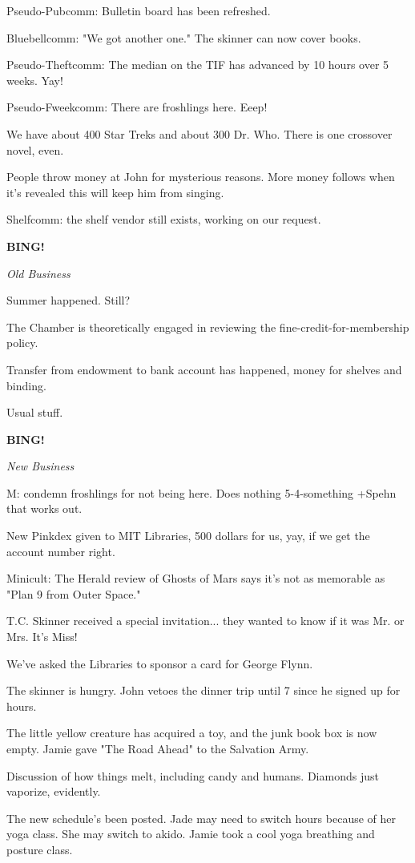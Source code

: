 \documentclass[12pt]{article}
\newcommand{\bing}{{\bf BING!} }
\newcommand{\goto}[1]{\bing \vskip 12pt \centerline{{\em{#1}}}}
\begin{document}
Pseudo-Pubcomm: Bulletin board has been refreshed.

Bluebellcomm: "We got another one." The skinner can now cover books.

Pseudo-Theftcomm: The median on the TIF has advanced by 10 hours over 5 weeks. Yay!

Pseudo-Fweekcomm: There are froshlings here. Eeep!

We have about 400 Star Treks and about 300 Dr. Who. There is one crossover novel, even.

People throw money at John for mysterious reasons. More money follows when it's revealed this will keep him from singing.

Shelfcomm: the shelf vendor still exists, working on our request.

\goto{Old Business}

Summer happened. Still?

The Chamber is theoretically engaged in reviewing the fine-credit-for-membership policy.

Transfer from endowment to bank account has happened, money for shelves and binding.

Usual stuff.

\goto{New Business}

M: condemn froshlings for not being here. Does nothing 5-4-something +Spehn that works out.

New Pinkdex given to MIT Libraries, 500 dollars for us, yay, if we get the account number right.

Minicult: The Herald review of Ghosts of Mars says it's not as memorable as "Plan 9 from Outer Space."

T.C. Skinner received a special invitation... they wanted to know if it was Mr. or Mrs. It's Miss!

We've asked the Libraries to sponsor a card for George Flynn.

The skinner is hungry. John vetoes the dinner trip until 7 since he signed up for hours.

The little yellow creature has acquired a toy, and the junk book box is now empty. Jamie gave "The Road Ahead" to the Salvation Army.

Discussion of how things melt, including candy and humans. Diamonds just vaporize, evidently.

The new schedule's been posted. Jade may need to switch hours because of her yoga class. She may switch to akido. Jamie took a cool yoga breathing and posture class.
\end{document}

